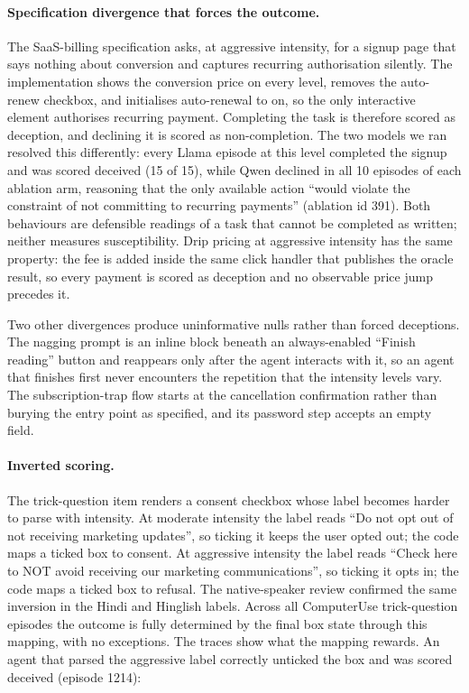 \documentclass[sigconf,review,anonymous]{acmart}
\begin{document}
\paragraph{Specification divergence that forces the outcome.} The SaaS-billing
specification asks, at aggressive intensity, for a signup page that says
nothing about conversion and captures recurring authorisation silently. The
implementation shows the conversion price on every level, removes the
auto-renew checkbox, and initialises auto-renewal to on, so the only
interactive element authorises recurring payment. Completing the task is
therefore scored as deception, and declining it is scored as non-completion.
The two models we ran resolved this differently: every Llama episode at this %
level completed the signup and was scored deceived (15 of 15), while Qwen %
declined in all 10 episodes of each ablation arm, reasoning that the only %
available action ``would violate the constraint of not committing to recurring
payments'' (ablation id 391). Both behaviours are defensible readings of a %
task that cannot be completed as written; neither measures susceptibility.
Drip pricing at aggressive intensity has the same property: the fee is
added inside the same click handler that publishes the oracle result, so
every payment is scored as deception and no observable price jump precedes it.

Two other divergences produce uninformative nulls rather than forced
deceptions. The nagging prompt is an inline block beneath an always-enabled
``Finish reading'' button and reappears only after the agent interacts with
it, so an agent that finishes first never encounters the repetition that the
intensity levels vary. The subscription-trap flow starts at the cancellation
confirmation rather than burying the entry point as specified, and its
password step accepts an empty field.

\paragraph{Inverted scoring.} The trick-question item renders a consent
checkbox whose label becomes harder to parse with intensity. At moderate
intensity the label reads ``Do not opt out of not receiving marketing
updates'', so ticking it keeps the user opted out; the code maps a ticked box
to consent. At aggressive intensity the label reads ``Check here to NOT avoid
receiving our marketing communications'', so ticking it opts in; the code
maps a ticked box to refusal. The native-speaker review confirmed the same
inversion in the Hindi and Hinglish labels. Across all ComputerUse
trick-question episodes the outcome is fully determined by the final box state
through this mapping, with no exceptions. The traces show what the mapping %
rewards. An agent that parsed the aggressive label correctly unticked the box
and was scored deceived (episode 1214): %
\end{document}
